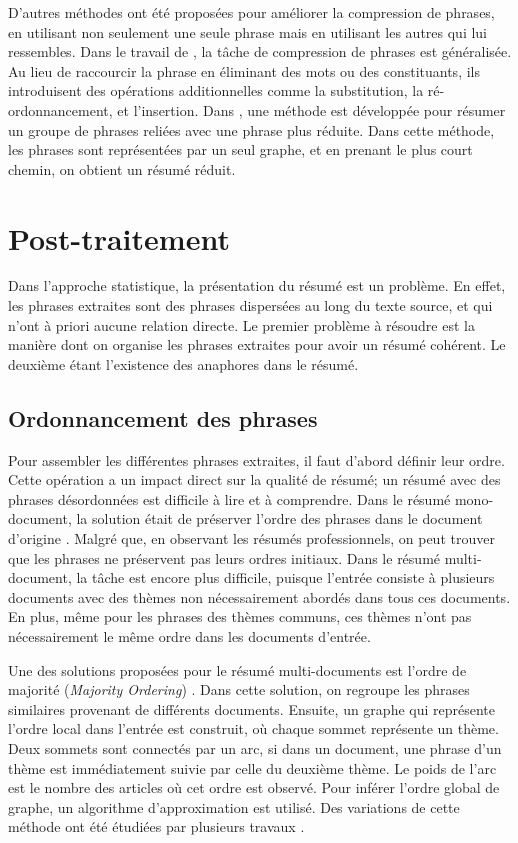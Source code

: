 \documentclass[a4paper,12pt,oneside]{../use/ESIthesis}
\begin{document}
D'autres méthodes ont été proposées pour améliorer la compression de phrases, en utilisant non seulement une seule phrase mais en utilisant les autres qui lui ressembles.
Dans le travail de \cite{08-cohn-lapata}, la tâche de compression de phrases est généralisée.  
Au lieu de raccourcir la phrase en éliminant des mots ou des constituants, ils introduisent des opérations additionnelles comme la substitution, la ré-ordonnancement, et l'insertion.
Dans \cite{10-filippova}, une méthode est développée pour résumer un groupe de phrases reliées avec une phrase plus réduite. 
Dans cette méthode, les phrases sont représentées par un seul graphe, et en prenant le plus court chemin, on obtient un résumé réduit.

\section{Post-traitement}

Dans l'approche statistique, la présentation du résumé est un problème.
En effet, les phrases extraites sont des phrases dispersées au long du texte source, et qui n'ont à priori aucune relation directe. 
Le premier problème à résoudre est la manière dont on organise les phrases extraites pour avoir un résumé cohérent. 
Le deuxième étant l'existence des anaphores dans le résumé.

\subsection{Ordonnancement des phrases} %

Pour assembler les différentes phrases extraites, il faut d'abord définir leur ordre. 
Cette opération a un impact direct sur la qualité de résumé; un résumé avec des phrases désordonnées est difficile à lire et à comprendre. 
Dans le résumé mono-document, la solution était de préserver l'ordre des phrases dans le document d'origine \cite{99-mckeown-al,00-radev-al,02-lin-hovy}. 
Malgré que, en observant les résumés professionnels, on peut trouver que les phrases ne préservent pas leurs ordres initiaux. 
Dans le résumé multi-document, la tâche est encore plus difficile, puisque l'entrée consiste à plusieurs documents avec des thèmes non nécessairement abordés dans tous ces documents. 
En plus, même pour les phrases des thèmes communs, ces thèmes n'ont pas nécessairement le même ordre dans les documents d'entrée. 

Une des solutions proposées pour le résumé multi-documents est l'ordre de majorité (\textit{Majority Ordering}) \cite{02-barzilay-al}. 
Dans cette solution, on regroupe les phrases similaires provenant de différents documents. 
Ensuite, un graphe qui représente l'ordre local dans l'entrée est construit, où chaque sommet représente un thème. 
Deux sommets sont connectés par un arc, si dans un document, une phrase d'un thème est immédiatement suivie par celle du deuxième thème. 
Le poids de l'arc est le nombre des articles où cet ordre est observé. 
Pour inférer l'ordre global de graphe, un algorithme d'approximation est utilisé. 
Des variations de cette méthode ont été étudiées par plusieurs travaux \cite{05-bollegala-al,08-ji-nie}.
\end{document}

